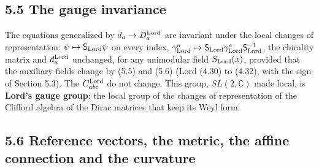 \documentclass[
  10pt,
]{article}
\begin{document}
\hypertarget{the-gauge-invariance}{%
\subsection{5.5 The gauge invariance}\label{the-gauge-invariance}}

The equations generalized by \(d_a\to D^{\rm Lord}_a\) are invariant
under the local changes of representation:
\(\psi\mapsto\mathsf S_{\rm Lord}\psi\) on every index,
\(\gamma^a_{\rm Lord}\mapsto\mathsf S_{\rm Lord}\gamma^a_{\rm Lord}\mathsf S_{\rm Lord}^{-1}\),
the chirality matrix and \(d^{\rm Lord}_a\) unchanged, for any
unimodular field \(S_{\rm Lord}(x)\), provided that the auxiliary fields
change by (5.5) and (5.6) (Lord (4.30) to (4.32), with the sign of
Section 5.3). The \(C^{\rm Lord}_{abc}\) do not change. This group,
\(SL(2,\mathbb C)\) made local, is \textbf{Lord's gauge group}: the
local group of the changes of representation of the Clifford algebra of
the Dirac matrices that keep its Weyl form.

\hypertarget{reference-vectors-the-metric-the-affine-connection-and-the-curvature}{%
\subsection{5.6 Reference vectors, the metric, the affine connection and
the
curvature}\label{reference-vectors-the-metric-the-affine-connection-and-the-curvature}}
\end{document}
